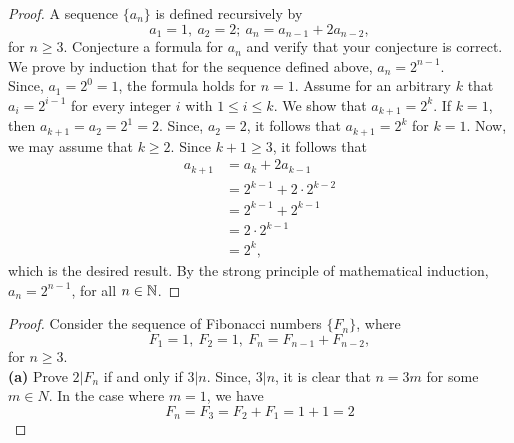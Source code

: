 \documentclass[12pt]{article}
\begin{document}
    \begin{proof}{A sequence \(\{a_n\}\) is defined recursively by
        \begin{equation*}
            a_1 = 1,\ a_2=2;\ a_n=a_{n-1} + 2a_{n-2},
        \end{equation*}
        for \(n\geq3\). Conjecture a formula for \(a_n\) and verify that your conjecture is correct.}
        We prove by induction that for the sequence defined above, \(a_n=2^{n-1}\). \\
        Since, \(a_1=2^0=1\), the formula holds for \(n=1\). Assume for an arbitrary \(k\) that \(a_i=2^{i-1}\) for every integer \(i\) with \(1\leq i \leq k\). We show that \(a_{k+1} = 2^k\). If \(k=1\), then \(a_{k+1} = a_2=2^1=2\). Since, \(a_2=2\), it follows that \(a_{k+1} = 2^k\) for \(k=1\). Now, we may assume that \(k\geq2\). Since \(k+1\geq3\), it follows that
        \begin{equation*}
            \begin{split}
                a_{k+1} &= a_{k} + 2a_{k-1}\\
                & = 2^{k-1} + 2\cdot2^{k-2}\\
                & = 2^{k-1} + 2^{k-1}\\
                & = 2\cdot 2^{k-1}\\
                &= 2^{k},
            \end{split}
        \end{equation*}
        which is the desired result. By the strong principle of mathematical induction, \(a_n=2^{n-1}\), for all \(n\in\mathbb{N}\).
    \end{proof}
    \begin{proof}{Consider the sequence of Fibonacci numbers \(\{F_n\}\), where
        \begin{equation*}
            F_1 = 1,\ F_2 =1,\ F_n=F_{n-1} + F_{n-2},
        \end{equation*}
        for \(n\geq3\).\\
        \textbf{(a)} Prove \(2|F_n\) if and only if \(3|n\).}
        Since, \(3|n\), it is clear that \(n=3m\) for some \(m\in N\). In the case where \(m=1\), we have
        \begin{equation*}
            F_n=F_3=F_2+F_1=1+1=2
        \end{equation*}
    \end{proof}
\end{document}
